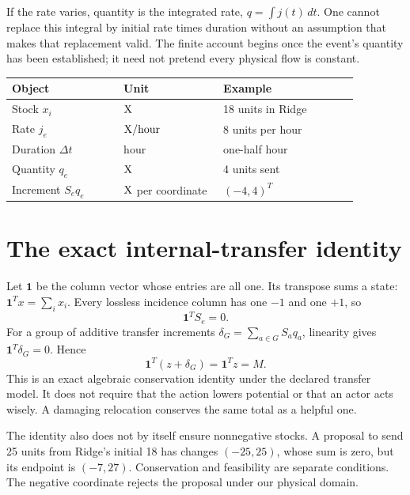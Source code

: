 If the rate varies, quantity is the integrated rate, \(q=\int j(t)\,dt\). One cannot replace this integral by initial rate times duration without an assumption that makes that replacement valid. The finite account begins once the event's quantity has been established; it need not pretend every physical flow is constant.

\begin{center}
\begin{tabular}{P{0.28\linewidth}P{0.25\linewidth}P{0.34\linewidth}}
\toprule
Object & Unit & Example\\
\midrule
Stock \(x_i\) & \(\mathrm{X}\) & 18 units in Ridge\\
Rate \(j_e\) & \(\mathrm{X}/\mathrm{hour}\) & 8 units per hour\\
Duration \(\Delta t\) & hour & one-half hour\\
Quantity \(q_e\) & \(\mathrm{X}\) & 4 units sent\\
Increment \(S_e q_e\) & \(\mathrm{X}\) per coordinate & \((-4,4)^T\)\\
\bottomrule
\end{tabular}
\end{center}

\section{The exact internal-transfer identity}
Let \(\mathbf{1}\) be the column vector whose entries are all one. Its transpose sums a state: \(\mathbf{1}^Tx=\sum_i x_i\). Every lossless incidence column has one \(-1\) and one \(+1\), so
\begin{equation}
 \mathbf{1}^TS_e=0.
\end{equation}
For a group of additive transfer increments \(\delta_G=\sum_{a\in G}S_aq_a\), linearity gives \(\mathbf{1}^T\delta_G=0\). Hence
\begin{equation}
 \mathbf{1}^T(z+\delta_G)=\mathbf{1}^Tz=M.
\end{equation}
This is an exact algebraic conservation identity under the declared transfer model. It does not require that the action lowers potential or that an actor acts wisely. A damaging relocation conserves the same total as a helpful one.

The identity also does not by itself ensure nonnegative stocks. A proposal to send 25 units from Ridge's initial 18 has changes \((-25,25)\), whose sum is zero, but its endpoint is \((-7,27)\). Conservation and feasibility are separate conditions. The negative coordinate rejects the proposal under our physical domain.

